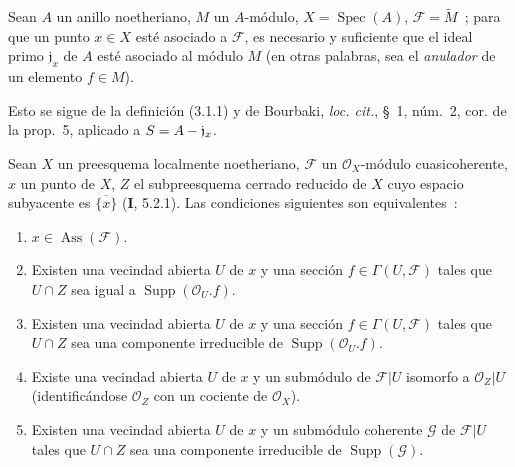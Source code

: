 \begin{proposition}[3.1.2]
\label{IV.2.3.1.2-fr}
Sean $A$ un anillo noetheriano, $M$ un $A$-módulo,
$X=\operatorname{Spec}(A)$, $\mathcal F=\widetilde M$~; para que un punto
$x\in X$ esté asociado a $\mathcal F$, es necesario y suficiente que el ideal
primo $\mathfrak j_x$ de $A$ esté asociado al módulo $M$ \textup{(en otras palabras,
sea el \emph{anulador} de un elemento $f\in M$)}.
\end{proposition}

Esto se sigue de la definición (3.1.1) y de Bourbaki, \emph{loc. cit.},
\S~1, núm.~2, cor. de la prop.~5, aplicado a
$S=A-\mathfrak j_x$.

\begin{proposition}[3.1.3]
\label{IV.2.3.1.3-fr}
Sean $X$ un preesquema localmente noetheriano, $\mathcal F$ un
$\mathcal O_X$-módulo cuasicoherente, $x$ un punto de $X$, $Z$ el
subpreesquema cerrado reducido de $X$ cuyo espacio subyacente es
$\overline{\{x\}}$ \textup{(\textbf I, 5.2.1)}. Las condiciones siguientes son equivalentes~:
\begin{enumerate}
\item[\emph{a)}] $x\in\operatorname{Ass}(\mathcal F)$.

\item[\emph{b)}] Existen una vecindad abierta $U$ de $x$ y una sección
$f\in\Gamma(U,\mathcal F)$ tales que $U\cap Z$ sea igual a
$\operatorname{Supp}(\mathcal O_U.f)$.
\item[\emph{b$'$)}] Existen una vecindad abierta $U$ de $x$ y una sección
$f\in\Gamma(U,\mathcal F)$ tales que $U\cap Z$ sea una componente
irreducible de $\operatorname{Supp}(\mathcal O_U.f)$.
\item[\emph{c)}] Existe una vecindad abierta $U$ de $x$ y un submódulo de
$\mathcal F|U$ isomorfo a $\mathcal O_Z|U$ \textup{(identificándose
$\mathcal O_Z$ con un cociente de $\mathcal O_X$)}.
\item[\emph{c$'$)}] Existen una vecindad abierta $U$ de $x$ y un submódulo
coherente $\mathcal G$ de $\mathcal F|U$ tales que $U\cap Z$ sea una
componente irreducible de $\operatorname{Supp}(\mathcal G)$.
\end{enumerate}
\end{proposition}

